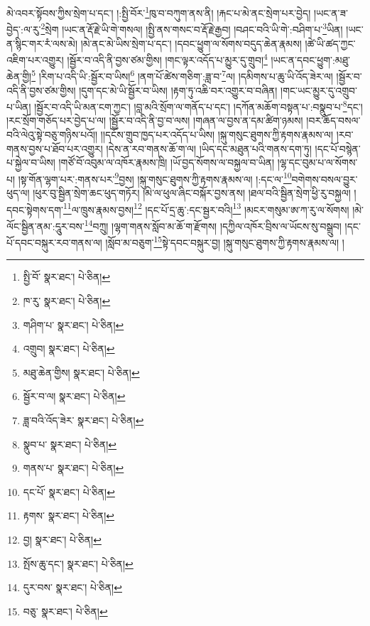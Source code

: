 མེ་འབར་སྟོབས་ཀྱིས་སྲེག་པ་དང་། །:སྤྱི་བོར་\footnote{སྤྱི་བོ་  སྣར་ཐང་།  པེ་ཅིན། }ཁུ་བ་བཀུག་ནས་ནི། །རྐང་པ་མེ་ནང་སྲེག་པར་བྱེད། །ཡང་ན་ཟ་བྱེད་:ལ་རུ་\footnote{ཁ་རུ་  སྣར་ཐང་།  པེ་ཅིན། }སྲེག །ཡང་ན་རྡོ་རྗེ་ཡི་གེ་གསལ། །སྤྱི་ནས་གསང་བ་རྡོ་རྗེ་རྒྱབ། །བཤང་བའི་ཡི་གེ་:བཤིག་པ་\footnote{གཤིག་པ་  སྣར་ཐང་།  པེ་ཅིན། }ཡིན། །ཡང་ན་སྙིང་གར་རཾ་ལས་མེ། །མེ་ནང་མེ་ཡིས་སྲེག་པ་དང་། །དབང་ཕྱུག་ལ་སོགས་བདུད་ཆེན་རྣམས། །ཚེ་ཡི་ཚད་ཀྱང་འཇིག་པར་འགྱུར། །སྦྱོར་བ་འདི་ནི་བྱས་ཙམ་གྱིས། །གང་ལྟར་འདོད་པ་མྱུར་དུ་གྲུབ།\footnote{འགྲུབ།  སྣར་ཐང་།  པེ་ཅིན། } །ཡང་ན་དབང་ཕྱུག་:མཐུ་ཆེན་གྱི།\footnote{མཐུ་ཆེན་གྱིས།  སྣར་ཐང་།  པེ་ཅིན། } །རིག་པ་འདི་ཡི་:སྦྱོར་བ་ཡིས།\footnote{སྦྱོར་བ་ལ།  སྣར་ཐང་།  པེ་ཅིན། } །ནག་པོ་ཚེས་གཅིག་:ཟླ་བ་\footnote{ཟླ་བའི་འོད་ཟེར་  སྣར་ཐང་།  པེ་ཅིན། }ལ། །དམིགས་པ་ཆུ་ཡི་འོད་ཟེར་ལ། །སྦྱོར་བ་འདི་ནི་བྱས་ཙམ་གྱིས། །དུག་དང་མེ་ཡི་སྦྱོར་བ་ཡིས། །རྟག་ཏུ་འཆི་བར་འགྱུར་བ་བཞིན། །གང་ཡང་མྱུར་དུ་འགྲུབ་པ་ཡིན། །སྦྱོར་བ་འདི་ཡི་མན་ངག་ཀྱང་། །བླ་མའི་སྲོག་ལ་གནོད་པ་དང་། །དཀོན་མཆོག་བསྟན་པ་:བསྣུབ་པ་\footnote{སྣུབ་པ་  སྣར་ཐང་།  པེ་ཅིན། }དང་། །རང་སྲོག་གཅོད་པར་བྱེད་པ་ལ། །སྦྱོར་བ་འདི་ནི་བྱ་བ་ལས། །གཞན་ལ་བྱས་ན་དམ་ཚིག་ཉམས། །བར་ཆོད་བསལ་བའི་ལེའུ་སྟེ་བཅུ་གཉིས་པའོ།། །།དངོས་གྲུབ་ཁྱད་པར་འདོད་པ་ཡིས། །སྐུ་གསུང་ཐུགས་ཀྱི་རྟགས་རྣམས་ལ། །རབ་གནས་བྱས་པ་ཐོབ་པར་འགྱུར། །དེས་ན་རབ་གནས་ཆོ་ག་ལ། །ཡིད་དང་མཐུན་པའི་གནས་དག་ཏུ། །དང་པོ་བསྙེན་པ་སྐྱེལ་བ་ཡིས། །གཙོ་བོ་འབུམ་ལ་འཁོར་རྣམས་ཁྲི། །ཡོ་བྱད་སོགས་ལ་བསྐྱལ་བ་ཡིན། །ལྷ་དང་བུམ་པ་ལ་སོགས་པ། །སྟ་གོན་ལྷག་པར་:གནས་པར་\footnote{གནས་པ་  སྣར་ཐང་།  པེ་ཅིན། }བྱས། །སྐུ་གསུང་ཐུགས་ཀྱི་རྟགས་རྣམས་ལ། །:དང་ལ་\footnote{དང་པོ་  སྣར་ཐང་།  པེ་ཅིན། }བགེགས་བསལ་བྱུར་ཕུད་ལ། །ཕུར་བུ་སྦྱིན་སྲེག་ཆང་ཕུད་གཏོར། །མེ་ལ་ཕུལ་ཞིང་བསྐོར་བྱས་ནས། །ཐལ་བའི་སྦྱིན་སྲེག་ཕྱི་རུ་བསྐྱལ། །དབང་སྟེགས་དག་\footnote{རྟགས་  སྣར་ཐང་།  པེ་ཅིན། }ལ་ཁྲུས་རྣམས་བྱས།\footnote{བྱ།  སྣར་ཐང་།  པེ་ཅིན། } །དང་པོ་དྲ་ཆུ་:དང་སྦྱར་བའི།\footnote{སྤོས་ཆུ་དང་།  སྣར་ཐང་།  པེ་ཅིན། } །མངར་གསུམ་ཨ་ཀ་རུ་ལ་སོགས། །མེ་ལོང་སྦྱིན་ནམ་:དཱུར་བས་\footnote{དུར་བས་  སྣར་ཐང་།  པེ་ཅིན། }བཀྲུ། །ལྷག་གནས་སློབ་མ་ཆོ་ག་རྫོགས། །དཀྱིལ་འཁོར་བྲིས་ལ་ཡོངས་སུ་བསྒྲུབ། །དང་པོ་དབང་བསྐུར་རབ་གནས་ལ། །སློབ་མ་བཅུག་\footnote{བཅུ་  སྣར་ཐང་།  པེ་ཅིན། }སྟེ་དབང་བསྐུར་བྱ། །སྐུ་གསུང་ཐུགས་ཀྱི་རྟགས་རྣམས་ལ། །
